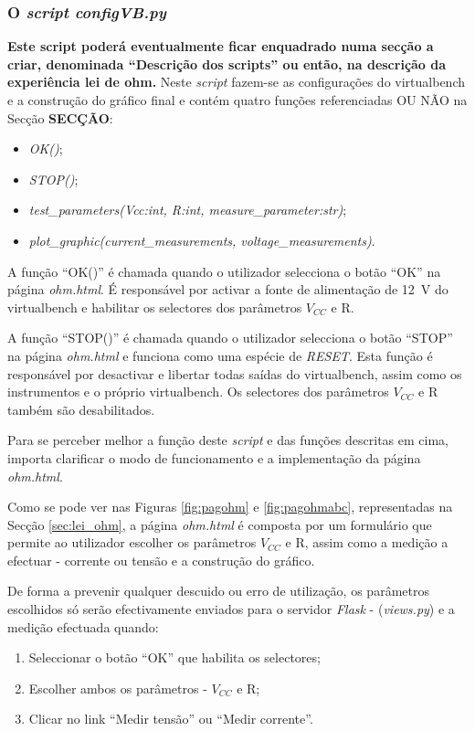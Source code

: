 \subsubsection{O \textit{script configVB.py}}
\textbf{Este script poderá eventualmente ficar enquadrado numa secção a criar, denominada ``Descrição dos scripts'' ou então, na descrição da experiência lei de ohm.}
Neste \textit{script} fazem-se as configurações do \acrshort{virtualbench} e a construção do gráfico final e contém quatro funções referenciadas OU NÃO na Secção \textbf{SECÇÃO}:
\begin{itemize}
	\item \textit{OK()};
	\item \textit{STOP()};
	\item \textit{test\_parameters(Vcc:int, R:int, measure\_parameter:str)};
	\item \textit{plot\_graphic(current\_measurements, voltage\_measurements)}.
\end{itemize}

A função ``OK()'' é chamada quando o utilizador selecciona o botão ``OK'' na página \textit{ohm.html}. É responsável por activar a fonte de alimentação de \SI{12}{\volt} do \acrshort{virtualbench} e habilitar os selectores dos parâmetros $V_{CC}$ e R.

A função ``STOP()'' é chamada quando o utilizador selecciona o botão ``STOP'' na página \textit{ohm.html} e funciona como uma espécie de \textit{RESET}. Esta função é responsável por desactivar e libertar todas saídas do \acrshort{virtualbench}, assim como os instrumentos e o próprio \acrshort{virtualbench}. Os selectores dos parâmetros $V_{CC}$ e R também são desabilitados.


Para se perceber melhor a função deste \textit{script} e das funções descritas em cima, importa clarificar o modo de funcionamento e a implementação da página \textit{ohm.html}.

Como se pode ver nas Figuras \ref{fig:pagohm} e \ref{fig:pagohmabc}, representadas na Secção \ref{sec:lei_ohm}, a página \textit{ohm.html} é composta por um formulário que permite ao utilizador escolher os parâmetros $V_{CC}$ e R, assim como a medição a efectuar - corrente ou tensão e a construção do gráfico.

De forma a prevenir qualquer descuido ou erro de utilização, os parâmetros escolhidos só serão efectivamente enviados para o servidor \textit{Flask} - (\textit{views.py}) e a medição efectuada quando:
\begin{enumerate}
	\item Seleccionar o botão ``OK'' que habilita os selectores;
	\item Escolher ambos os parâmetros - $V_{CC}$ e R;
	\item Clicar no link ``Medir tensão'' ou ``Medir corrente''.
\end{enumerate}

